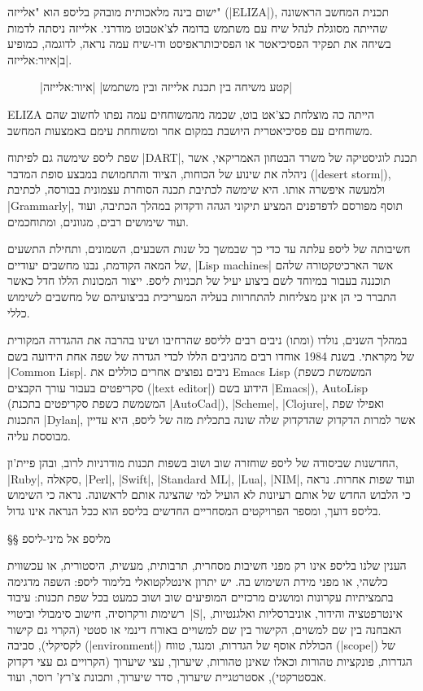 ישום בינה מלאכותית מובהק בליספ הוא "אלייזה" (\E|ELIZA|), תכנית המחשב הראשונה
שהייתה מסוגלת לנהל שיח עם משתמש בדומה לצ'אטבוט מודרני. אלייזה ניסתה לדמות בשיחה
את תפקיד הפסיכיאטר או הפסיכותראפיסט ודו-שיח עמה נראה, לדוגמה, כמופיע
ב|איור:אלייזה|.

\begin{figure}[H]
\begin{LTR} \scriptsize
  
\end{LTR}
|קטע משיחה בין תכנת אלייזה ובין משתמש|
|איור:אלייזה|
\end{figure}

ELIZA הייתה כה מוצלחת כצ'אט בוט, שכמה מהמשוחחים עמה נפתו לחשוב שהם משוחחים עם
פסיכיאטרית היושבת במקום אחר ומשוחחת עימם באמצעות המחשב.

שפת ליספ שימשה גם לפיתוח \E|DART|, תכנת לוגיסטיקה של משרד הבטחון האמריקאי, אשר
ניהלה את שינוע של הכוחות, הציוד והתחמושת במבצע סופת המדבר (\E|desert storm|),
ולמעשה איפשרה אותו. היא שימשה לכתיבת תכנה הסוחרת עצמונית בבורסה, לכתיבת
\E|Grammarly|, תוסף מפורסם לדפדפנים המציע תיקוני הגהה ודקדוק במהלך הכתיבה, ועוד
ועוד שימושים רבים, מגוונים, ומתוחכמים.

חשיבותה של ליספ עלתה עד כדי כך שבמשך כל שנות השבעים, השמונים, ותחילת התשעים של
המאה הקודמת, נבנו מחשבים יעודיים, \E|Lisp machines| אשר הארכיטקטורה שלהם תוכננה
בעבור במיוחד לשם ביצוע יעיל של תכניות ליספ. ייצור המכונות הללו חדל כאשר התברר
כי הן אינן מצליחות להתחרוות בעליה המעריכית בביצועיהם של מחשבים לשימוש כללי.

במהלך השנים, נולדו (ומתו) ניבים רבים לליספ שהרחיבו ושינו בהרבה את ההגדרה
המקורית של מקראתי. בשנת 1984 אוחדו רבים מהניבים הללו לכדי הגדרה של שפה אחת
הידועה בשם \E|Common Lisp|. ניבים נפוצים אחרים כוללים את Emacs Lisp (המשמשת
כשפת סקריפטים בעבור עורך הקבצים (\E|text editor|) הידוע בשם \E|Emacs|),
AutoLisp (המשמשת כשפת סקריפטים בתכנת \E|AutoCad|), \E|Scheme|, \E|Clojure|,
ואפילו שפת התכנות \E|Dylan|, אשר למרות הדקדוק שהדקדוק שלה שונה בתכלית מזה של
ליספ, היא עדיין מבוססת עליה.

החדשנות שביסודה של ליספ שוחזרה שוב ושוב בשפות תכנות מודרניות לרוב, ובהן
פיית'ון, \E|Ruby|, סקאלה, \E|Perl|, \E|Swift|, \E|Standard ML|, \E|Lua|,
\E|NIM|, ועוד שפות אחרות. נראה כי הלבוש החדש של אותם רעיונות לא הועיל למי
שהציגה אותם לראשונה. נראה כי השימוש בליספ דועך, ומספר הפרויקטים המסחריים החדשים
בליספ הוא ככל הנראה אינו גדול.

§§ מליספ אל מיני-ליספ

הענין שלנו בליספ אינו רק מפני חשיבות מסחרית, תרבותית, מעשית, היסטורית, או
עכשווית כלשהי, או מפני מידת השימוש בה. יש יתרון אינטלקטואלי בלימוד ליספ: השפה
מדגימה בתמציתיות עקרונות ומושגים מרכזיים המופיעים שוב ושוב כמעט בכל שפת תכנות:
עיבוד רשימות ורקרוסיה, חישוב סימבולי וביטויי~\E|S|, אינטרפטציה והידור,
אוניברסליות ואלגנטיות, האבחנה בין שם למשוים, הקישור בין שם למשויים באורח דינמי
או סטטי (הקרוי גם קישור לקסיקלי), סביבה (\E|environment|) הכוללת אוסף של
הגדרות, ומנגד, טווח (\E|scope|) של הגדרות, פונקציות טהורות וכאלו שאינן טהורות,
שיערוך, עצי שיערוך (הקרויים גם עצי דקדוק אבסטרקטי), אסטרטגיית שיערוך, סדר
שיערוך, ותכונת צ'רץ' רוסר, ועוד.

